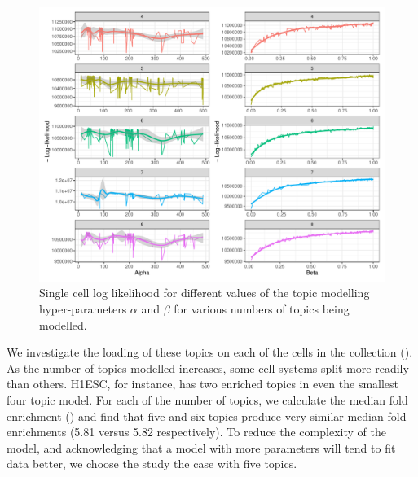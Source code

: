 
\begin{figure}
  \centering
  \includegraphics[width=\textwidth]{plot/ch4/sc_opt_params}
  \caption{Single cell log likelihood for different values of the topic modelling hyper-parameters $\alpha$ and $\beta$ for various numbers of topics being modelled.}
  \label{fig:sc_opt_params}
\end{figure}

We investigate the loading of these topics on each of the cells in the collection (). As the number of topics modelled increases, some cell systems split more readily than others. H1ESC, for instance, has two enriched topics in even the smallest four topic model. For each of the number of topics, we calculate the median fold enrichment () and find that five and six topics produce very similar median fold enrichments (5.81 versus 5.82 respectively). To reduce the complexity of the model, and acknowledging that a model with more parameters will tend to fit data better, we choose the study the case with five topics.  

